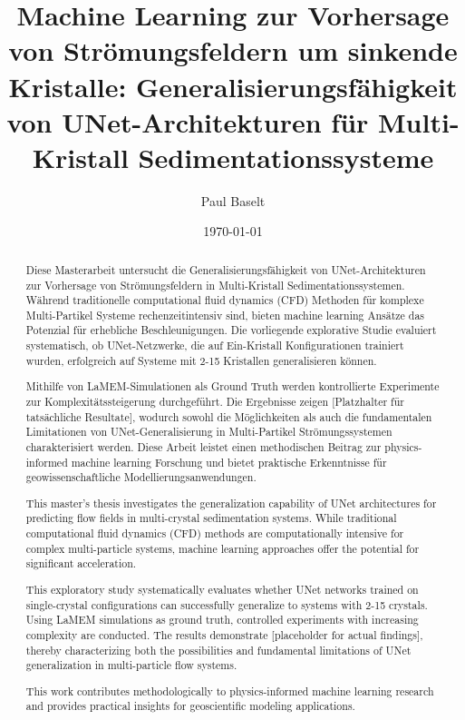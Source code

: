 \documentclass[12pt,twoside,openright]{scrreprt}
\title{Machine Learning zur Vorhersage von Strömungsfeldern um sinkende Kristalle: Generalisierungsfähigkeit von UNet-Architekturen für Multi-Kristall Sedimentationssysteme}
\author{Paul Baselt}
\date{\today}
\theoremstyle{definition}
\theoremstyle{plain}
\begin{document}
	
	\maketitle
	
	\begin{abstract}
		Diese Masterarbeit untersucht die Generalisierungsfähigkeit von UNet-Architekturen zur Vorhersage von Strömungsfeldern in Multi-Kristall Sedimentationssystemen. Während traditionelle computational fluid dynamics (CFD) Methoden für komplexe Multi-Partikel Systeme rechenzeitintensiv sind, bieten machine learning Ansätze das Potenzial für erhebliche Beschleunigungen. Die vorliegende explorative Studie evaluiert systematisch, ob UNet-Netzwerke, die auf Ein-Kristall Konfigurationen trainiert wurden, erfolgreich auf Systeme mit 2-15 Kristallen generalisieren können. 
		
		Mithilfe von LaMEM-Simulationen als Ground Truth werden kontrollierte Experimente zur Komplexitätssteigerung durchgeführt. Die Ergebnisse zeigen [Platzhalter für tatsächliche Resultate], wodurch sowohl die Möglichkeiten als auch die fundamentalen Limitationen von UNet-Generalisierung in Multi-Partikel Strömungssystemen charakterisiert werden. Diese Arbeit leistet einen methodischen Beitrag zur physics-informed machine learning Forschung und bietet praktische Erkenntnisse für geowissenschaftliche Modellierungsanwendungen.
	\end{abstract}
	
	\begin{otherlanguage}{english}
		\begin{abstract}
			This master's thesis investigates the generalization capability of UNet architectures for predicting flow fields in multi-crystal sedimentation systems. While traditional computational fluid dynamics (CFD) methods are computationally intensive for complex multi-particle systems, machine learning approaches offer the potential for significant acceleration.
			
			This exploratory study systematically evaluates whether UNet networks trained on single-crystal configurations can successfully generalize to systems with 2-15 crystals. Using LaMEM simulations as ground truth, controlled experiments with increasing complexity are conducted. The results demonstrate [placeholder for actual findings], thereby characterizing both the possibilities and fundamental limitations of UNet generalization in multi-particle flow systems.
			
			This work contributes methodologically to physics-informed machine learning research and provides practical insights for geoscientific modeling applications.
		\end{abstract}
	\end{otherlanguage}
	
\end{document}
